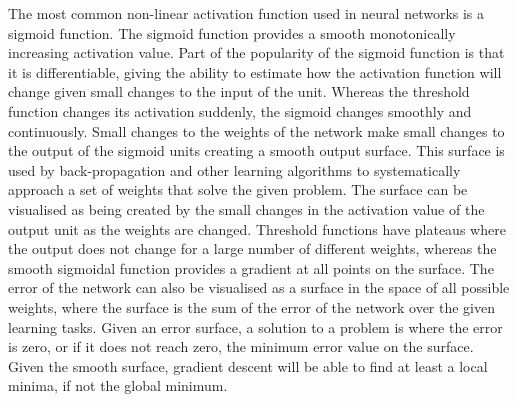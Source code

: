 The most common non-linear activation function used in neural networks is a sigmoid function.  The sigmoid function provides a smooth monotonically increasing activation value.  Part of the popularity of the sigmoid function is that it is differentiable, giving the ability to estimate how the activation function will change given small changes to the input of the unit.  Whereas the threshold function changes its activation suddenly, the sigmoid changes smoothly and continuously.  Small changes to the weights of the network make small changes to the output of the sigmoid units creating a smooth output surface.  This surface is used by back-propagation and other learning algorithms to systematically approach a set of weights that solve the given problem.  The surface can be visualised as being created by the small changes in the activation value of the output unit as the weights are changed.  Threshold functions have plateaus where the output does not change for a large number of different weights, whereas the smooth sigmoidal function provides a gradient at all points on the surface.  The error of the network can also be visualised as a surface in the space of all possible weights, where the surface is the sum of the error of the network over the given learning tasks.  Given an error surface, a solution to a problem is where the error is zero, or if it does not reach zero, the minimum error value on the surface.  Given the smooth surface, gradient descent will be able to find at least a local minima, if not the global minimum.

